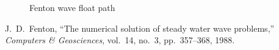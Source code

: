 \documentclass[11pt,letterpaper]{article}
\begin{document}
\begin{figure}[H]
    \centering
    \resizebox{\textwidth}{!}{}
    \caption{Fenton wave float path}
    \label{fig:waveParticlePath}
\end{figure}

\begin{thebibliography}{9}
J.~D.~Fenton, ``The numerical solution of steady water wave problems,'' \emph{Computers \& Geosciences}, vol.~14, no.~3, pp.~357--368, 1988.
\end{thebibliography}
\end{document}
